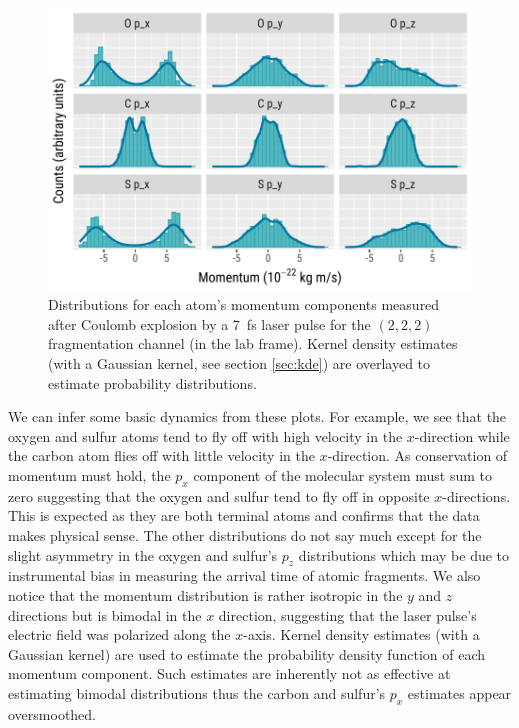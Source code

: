\begin{figure}
  \centering
  \includegraphics[width=\textwidth]{Plots/OCS2227fsMomentum}
  \caption[Distributions for each atom's momentum components measured after Coulomb explosion by a \SI{7}{\fs} laser pulse for the $(2,2,2)$ fragmentation channel (in the lab frame).]
  {Distributions for each atom's momentum components measured after Coulomb explosion by a \SI{7}{\fs} laser pulse for the $(2,2,2)$ fragmentation channel (in the lab frame). Kernel density estimates (with a Gaussian kernel, see section \ref{sec:kde}) are overlayed to estimate probability distributions.}
  \label{fig:OCS2227fsMomentum}
\end{figure}

We can infer some basic dynamics from these plots. For example, we see that the oxygen and sulfur atoms tend to fly off with high velocity in the $x$-direction while the carbon atom flies off with little velocity in the $x$-direction. As conservation of momentum must hold, the $p_x$ component of the molecular system must sum to zero suggesting that the oxygen and sulfur tend to fly off in opposite $x$-directions. This is expected as they are both terminal atoms and confirms that the data makes physical sense. The other distributions do not say much except for the slight asymmetry in the oxygen and sulfur's $p_z$ distributions which may be due to instrumental bias in measuring the arrival time of atomic fragments. We also notice that the momentum distribution is rather isotropic in the $y$ and $z$ directions but is bimodal in the $x$ direction, suggesting that the laser pulse's electric field was polarized along the $x$-axis. Kernel density estimates (with a Gaussian kernel) are used to estimate the probability density function of each momentum component. Such estimates are inherently not as effective at estimating bimodal distributions thus the carbon and sulfur's $p_x$ estimates appear oversmoothed.

